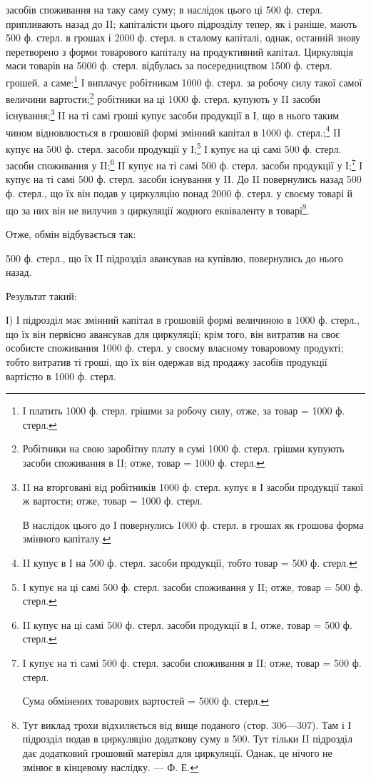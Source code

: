 засобів споживання на таку саму суму; в наслідок цього ці 500 ф. стерл.
припливають назад до II; капіталісти цього підрозділу тепер, як і раніше,
мають 500 ф. стерл. в грошах і 2000 ф. стерл. в сталому капіталі,
однак, останній знову перетворено з форми товарового капіталу на продуктивний
капітал. Циркуляція маси товарів на 5000 ф. стерл. відбулась
за посередництвом 1500 ф. стерл. грошей, а саме:\footnote{
І платить 1000 ф. стерл. грішми за робочу силу, отже, за товар
= 1000 ф. стерл.
} І виплачує робітникам
1000 ф. стерл. за робочу силу такої самої величини вартости;\footnote{
Робітники на свою заробітну плату в сумі 1000 ф. стерл. грішми
купують засоби споживання в II; отже, товар = 1000 ф. стерл.
} робітники на ці 1000 ф. стерл. купують у II засоби існування;\footnote{
II на вторговані від робітників 1000 ф. стерл. купує в І засоби
продукції такої ж вартости; отже, товар = 1000 ф. стерл.

В наслідок цього до І повернулись 1000 ф. стерл. в грошах як грошова
форма змінного капіталу.
} II на ті самі гроші купує засоби продукції в І, що в нього таким
чином відновлюється в грошовій формі змінний капітал в 1000 ф. стерл.;\footnote{
II купує в І на 500 ф. стерл. засоби продукції, тобто товар =
500 ф. стерл.
} II купує на 500 ф. стерл. засоби продукції у І;\footnote{
І купує на ці самі 500 ф. стерл. засоби споживання у II; отже,
товар = 500 ф. стерл.
} І купує на ці
самі 500 ф. стерл. засоби споживання у II;\footnote{
II купує на ці самі 500 ф. стерл. засоби продукції в І, отже,
товар = 500 ф. стерл.
} II купує на ті самі 500 ф.
стерл. засоби продукції у І;\footnote{
І купує на ті самі 500 ф. стерл. засоби споживання в II; отже,
товар = 500 ф. стерл.

Сума обмінених товарових вартостей = 5000 ф. стерл.
} І купує на ті самі 500 ф. стерл. засоби
існування у II. До II повернулись назад 500 ф. стерл., що їх він подав у
циркуляцію понад 2000 ф. стерл. у своєму товарі й що за них він не
вилучив з циркуляції жодного еквіваленту в товарі\footnote{
Тут виклад трохи відхиляється від вище поданого (стор. 306—307). Там і
І підрозділ подав в циркуляцію додаткову суму в 500. Тут тільки II підрозділ дає
додатковий грошовий матеріял для циркуляції. Однак, це нічого не змінює в
кінцевому наслідку. — Ф. Е.
}.

Отже, обмін відбувається так:

500 ф. стерл., що їх II підрозділ авансував на купівлю, повернулись
до нього назад.

Результат такий:

І) І підрозділ має змінний капітал в грошовій формі величиною в 1000 ф.
стерл., що їх він первісно авансував для циркуляції; крім того, він витратив
на своє особисте споживання 1000 ф. стерл. у своєму власному
товаровому продукті; тобто витратив ті гроші, що їх він одержав від продажу
засобів продукції вартістю в 1000 ф. стерл.